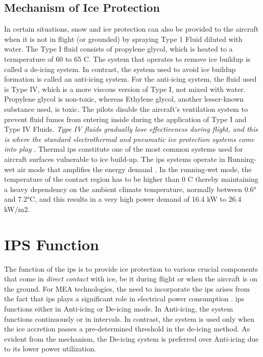 \documentclass[english]{kththesis}
\begin{document}
\subsection{Mechanism of Ice Protection}
\label{subsec:Icingmech}
In certain situations, snow and ice protection can also be provided to the aircraft when it is not in flight (or grounded) by spraying Type 1 Fluid diluted with water. The Type I fluid consists of propylene glycol, which is heated to a termperature of 60 to 65 \degree C. The system that operates to remove ice buildup is called a de-icing system. In contrast, the system used to avoid ice buildup formation is called an anti-icing system. For the anti-icing system, the fluid used is Type IV, which is a more viscous version of Type I, not mixed with water. Propylene glycol is non-toxic, whereas Ethylene glycol, another lesser-known substance used, is toxic. The pilots disable the aircraft's ventilation system to prevent fluid fumes from entering inside during the application of Type I and Type IV Fluids. \textit{Type IV fluids gradually lose effectiveness during flight, and this is where the standard electrothermal and pneumatic ice protection systems come into play} \cite{Arnot2018}. Thermal \acrshort{ips} constitute one of the most common systems used for aircraft surfaces vulnerable to ice build-up. The \acrshort{ips} systems operate in {Running-wet} air mode that amplifies the energy demand \cite{khalil2}. In the running-wet mode, the temperature of the contact region has to be higher than 0 \degree C thereby maintaining a heavy dependency on the ambient climate temperature, normally between 0.6° and 7.2°C, and this results in a very high power demand of 16.4 kW to 26.4 kW/m2.

\section{IPS Function}
\label{sec:IPSfunction}
The function of the \acrshort{ips} is to provide ice protection to various crucial components that come in \textit{direct contact} with ice, be it during flight or when the aircraft is on the ground. For MEA technologies, the need to incorporate the \acrshort{ips} arises from the fact that \acrshort{ips} plays a significant role in electrical power consumption \cite{regair}. 
\acrshort{ips} functions either in Anti-icing or De-icing mode. In Anti-icing, the system functions continuously or in intervals. In contrast, the system is used only when the ice accretion passes a pre-determined threshold in the de-icing method. As evident from the mechanism, the De-icing system is preferred over Anti-icing due to its lower power utilization.
\end{document}
